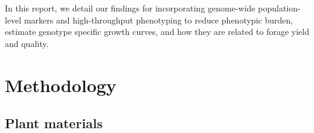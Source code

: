 \documentclass[12pt, letterpaper]{article}
\begin{document}



In this report, we detail our findings for incorporating genome-wide population-level markers and high-throughput phenotyping to reduce phenotypic burden, estimate genotype specific growth curves, and how they are related to forage yield and quality. 



\section*{Methodology}

\subsection{Plant materials}
\end{document}
